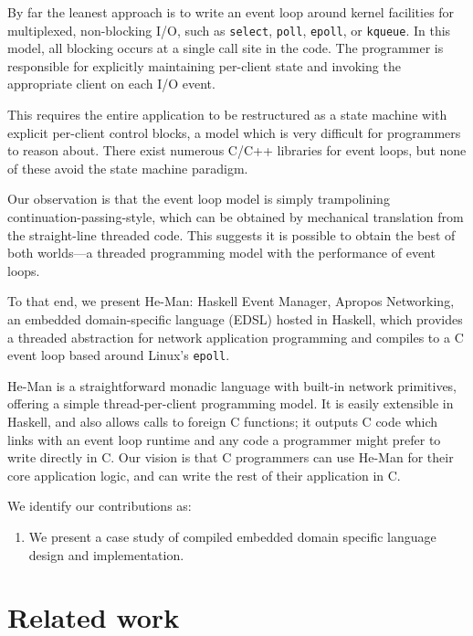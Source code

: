 \documentclass[preprint,10pt]{sigplanconf}
\renewcommand{\t}{\texttt}
\begin{document}
By far the leanest approach is to write an event loop around kernel facilities
for multiplexed, non-blocking I/O, such as \t{select}, \t{poll}, \t{epoll}, or
\t{kqueue}. In this model, all blocking occurs at a single call site in the
code. The programmer is responsible for explicitly maintaining per-client state
and invoking the appropriate client on each I/O event.

This requires the entire application to be restructured as a state machine with
explicit per-client control blocks, a model which is very difficult for
programmers to reason about. There exist numerous C/C++ libraries for event
loops, but none of these avoid the state machine paradigm.

Our observation is that the event loop model is simply trampolining
continuation-passing-style, %
which can be obtained by mechanical translation from the straight-line threaded
code. This suggests it is possible to obtain the best of both worlds---a
threaded programming model with the performance of event loops. 

To that end, we present He-Man: Haskell Event Manager, Apropos Networking, an
embedded domain-specific language (EDSL) hosted in Haskell, which provides a
threaded abstraction for network application programming and compiles to a C
event loop based around Linux's \t{epoll}.

He-Man is a straightforward monadic language with built-in network primitives,
offering a simple thread-per-client programming model. It is easily extensible
in Haskell, and also allows calls to foreign C functions; it outputs C code
which links with an event loop runtime and any code a programmer might prefer to
write directly in C. Our vision is that C programmers can use He-Man for their
core application logic, and can write the rest of their application in C. 

We identify our contributions as:
\begin{enumerate}

\item We present a case study of compiled embedded domain specific
  language design and implementation.
\end{enumerate}


\section{Related work}
\end{document}

